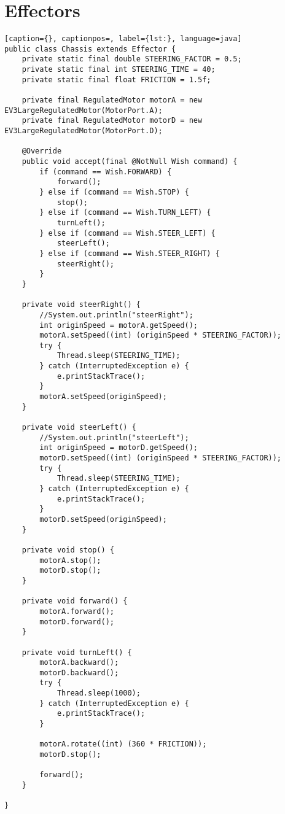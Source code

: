 \section{Effectors}
\begin{lstlisting}[caption={}, captionpos=, label={lst:}, language=java]
public class Chassis extends Effector {
    private static final double STEERING_FACTOR = 0.5;
    private static final int STEERING_TIME = 40;
    private static final float FRICTION = 1.5f;

    private final RegulatedMotor motorA = new EV3LargeRegulatedMotor(MotorPort.A);
    private final RegulatedMotor motorD = new EV3LargeRegulatedMotor(MotorPort.D);

    @Override
    public void accept(final @NotNull Wish command) {
        if (command == Wish.FORWARD) {
            forward();
        } else if (command == Wish.STOP) {
            stop();
        } else if (command == Wish.TURN_LEFT) {
            turnLeft();
        } else if (command == Wish.STEER_LEFT) {
            steerLeft();
        } else if (command == Wish.STEER_RIGHT) {
            steerRight();
        }
    }

    private void steerRight() {
        //System.out.println("steerRight");
        int originSpeed = motorA.getSpeed();
        motorA.setSpeed((int) (originSpeed * STEERING_FACTOR));
        try {
            Thread.sleep(STEERING_TIME);
        } catch (InterruptedException e) {
            e.printStackTrace();
        }
        motorA.setSpeed(originSpeed);
    }

    private void steerLeft() {
        //System.out.println("steerLeft");
        int originSpeed = motorD.getSpeed();
        motorD.setSpeed((int) (originSpeed * STEERING_FACTOR));
        try {
            Thread.sleep(STEERING_TIME);
        } catch (InterruptedException e) {
            e.printStackTrace();
        }
        motorD.setSpeed(originSpeed);
    }

    private void stop() {
        motorA.stop();
        motorD.stop();
    }

    private void forward() {
        motorA.forward();
        motorD.forward();
    }

    private void turnLeft() {
        motorA.backward();
        motorD.backward();
        try {
            Thread.sleep(1000);
        } catch (InterruptedException e) {
            e.printStackTrace();
        }

        motorA.rotate((int) (360 * FRICTION));
        motorD.stop();

        forward();
    }

}
\end{lstlisting}

